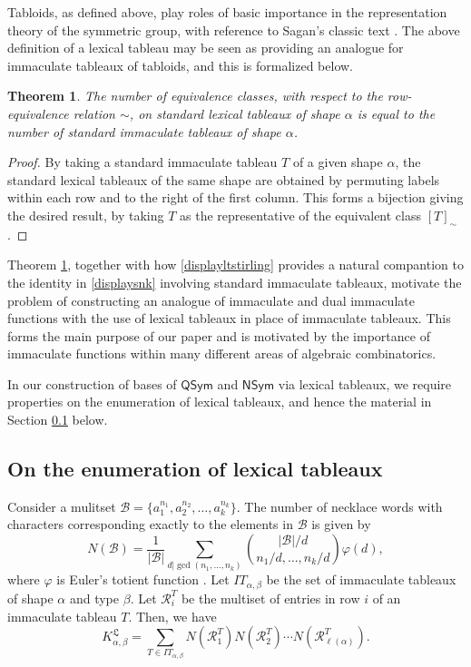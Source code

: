 \documentclass{amsart}
\newtheorem{theorem}{Theorem}[section]
\theoremstyle{definition}
\newcommand{\lx}{\mathfrak{L}}
\begin{document}
 Tabloids, as defined above, play roles of basic importance in the representation theory of the symmetric group, with reference to Sagan's 
 classic text \cite[\S2.1]{Sagan2001}. The above definition of a lexical tableau may be seen as providing an analogue for immaculate 
 tableaux of tabloids, and this is formalized below. 

\begin{theorem}\label{theoremclasses}
 The number of equivalence classes, with respect to the row-equivalence relation $\sim$, on standard lexical tableaux of shape $\alpha$ 
 is equal to the number of standard immaculate tableaux of shape $\alpha$.
\end{theorem}

\begin{proof}
 By taking a standard immaculate tableau $T$ of a given shape $\alpha$, the standard lexical tableaux of the same shape are obtained 
 by permuting labels within each row and to the right of the first column. This forms a bijection giving the desired result, by taking $T$ as 
 the representative of the equivalent class $[T]_{\sim}$.
\end{proof}

 Theorem \ref{theoremclasses}, together with how \eqref{displayltstirling} provides a natural compantion to the identity in 
 \eqref{displaysnk} involving standard immaculate tableaux, motivate  the problem of constructing an analogue of immaculate and dual 
 immaculate functions with the use of lexical tableaux in place of immaculate tableaux. This forms the main purpose of our paper and is 
 motivated by the importance of immaculate functions within many different areas of algebraic combinatorics. 
 
 In our construction of bases of $\textsf{QSym}$ and $\textsf{NSym}$ via lexical tableaux, we require properties on the enumeration of 
 lexical tableaux, and hence the material in Section \ref{subsectionEnumeration} below. 

\subsection{On the enumeration of lexical tableaux}\label{subsectionEnumeration}
 Consider a mulitset $\mathcal{B} =\{a_1^{n_1}, a_2^{n_2}, \ldots, a_k^{n_k} \}$. The number of necklace words with characters corresponding exactly to the elements in $\mathcal{B}$ is given by \[N(\mathcal{B}) = \frac{1}{|\mathcal{B}|} \sum_{d|\gcd(n_1, \ldots, n_k)} \binom{|\mathcal{B}|/d}{n_1/d, \ldots, n_k/d} \varphi(d),\]
where $\varphi$ is Euler's totient function \cite{gilbert1961symmetry}. Let $IT_{\alpha,\beta}$ be the set of immaculate tableaux of shape $\alpha$ and type $\beta$. Let $\mathcal{R}^T_i$ be the multiset of entries in row $i$ of an immaculate tableau $T$. 
 Then, we have \[ K^{\lx}_{\alpha, \beta} = \sum_{T \in IT_{\alpha, \beta}} N(\mathcal{R}^T_1)N(\mathcal{R}^T_2) \cdots N(\mathcal{R}^T_{\ell(\alpha)}).\]
\end{document}
